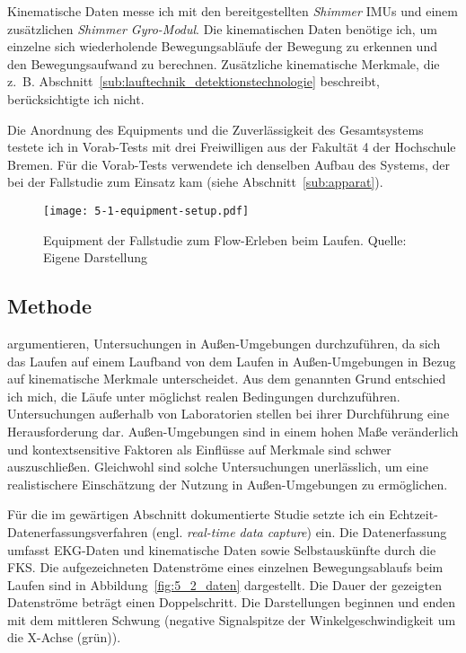 Kinematische Daten messe ich mit den bereitgestellten \emph{Shimmer} \acp{IMU} und einem zusätzlichen \emph{Shimmer Gyro-Modul}. Die kinematischen Daten benötige ich, um einzelne sich wiederholende Bewegungsabläufe der Bewegung zu erkennen und den Bewegungsaufwand zu berechnen. Zusätzliche kinematische Merkmale, die z.~B. Abschnitt~\ref{sub:lauftechnik_detektionstechnologie} beschreibt, berücksichtigte ich nicht.

Die Anordnung des Equipments und die Zuverlässigkeit des Gesamtsystems testete ich in Vorab-Tests mit drei Freiwilligen aus der Fakultät 4 der Hochschule Bremen. Für die Vorab-Tests verwendete ich denselben Aufbau des Systems, der bei der Fallstudie zum Einsatz kam (siehe Abschnitt~\ref{sub:apparat}).

\begin{figure}[t]
	\centering
		\texttt{[image: 5-1-equipment-setup.pdf]}
	\caption[Equipment der Fallstudie zum Flow-Erleben beim Laufen]{Equipment der Fallstudie zum Flow-Erleben beim Laufen. Quelle: Eigene Darstellung}
	\label{fig:5_1_equipment_setup}
\end{figure}

\subsection{Methode}

\citet{Strohrmann2012} argumentieren, Untersuchungen in Außen-Umgebungen durchzuführen, da sich das Laufen auf einem Laufband von dem Laufen in Außen-Umgebungen in Bezug auf kinematische Merkmale unterscheidet. Aus dem genannten Grund entschied ich mich, die Läufe unter möglichst realen Bedingungen durchzuführen. Untersuchungen außerhalb von Laboratorien stellen bei ihrer Durchführung eine Herausforderung dar. Außen-Umgebungen sind in einem hohen Maße veränderlich und kontextsensitive Faktoren als Einflüsse auf Merkmale sind schwer auszuschließen. Gleichwohl sind solche Untersuchungen unerlässlich, um eine realistischere Einschätzung der Nutzung in Außen-Umgebungen zu ermöglichen.

Für die im gewärtigen Abschnitt dokumentierte Studie setzte ich ein Echtzeit-Datenerfassungsverfahren (engl. \emph{real-time data capture}) ein. Die Datenerfassung umfasst \ac{EKG}-Daten und kinematische Daten sowie Selbstauskünfte durch die \ac{FKS}. Die aufgezeichneten Datenströme eines einzelnen Bewegungsablaufs beim Laufen sind in Abbildung~\ref{fig:5_2_daten} dargestellt. Die Dauer der gezeigten Datenströme beträgt einen Doppelschritt. Die Darstellungen beginnen und enden mit dem mittleren Schwung (negative Signalspitze der Winkelgeschwindigkeit um die X-Achse (grün)).

